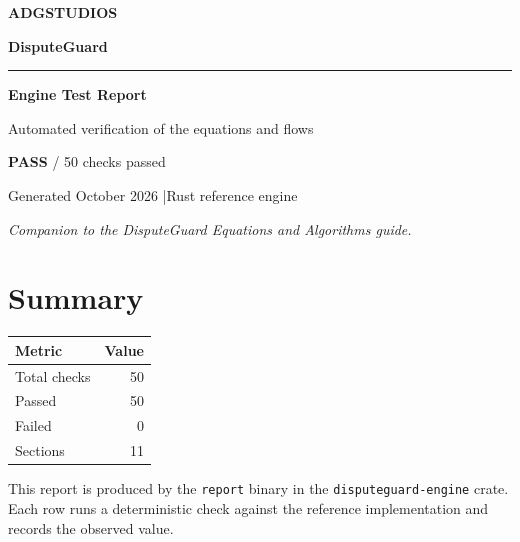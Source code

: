 \documentclass[11pt,a4paper]{article}
\newcommand{\pass}{\textcolor{PassGreen}{\textbf{PASS}}}
\begin{document}
\begin{titlepage}
  \centering
  \vspace*{2cm}
  {\Huge\bfseries ADGSTUDIOS\par}
  \vspace{0.4cm}
  {\LARGE\color{ADGBlue}\bfseries DisputeGuard\par}
  \vspace{1.3cm}
  \rule{0.85\textwidth}{0.8pt}
  \vspace{0.8cm}
  {\Large\bfseries Engine Test Report\par}
  \vspace{0.4cm}
  {\large Automated verification of the equations and flows\par}
  \vfill
  {\Large \pass{} / 50 checks passed\par}
  \vspace{0.6cm}
  {\large Generated October 2026 \quad|\quad Rust reference engine\par}
  \vfill
  \textit{Companion to the DisputeGuard Equations and Algorithms guide.}
\end{titlepage}

\section*{Summary}
\begin{center}
\begin{tabular}{@{}lr@{}}
\toprule
Metric & Value \\
\midrule
Total checks & 50 \\
Passed & \textcolor{PassGreen}{50} \\
Failed & \textcolor{FailRed}{0} \\
Sections & 11 \\
\bottomrule
\end{tabular}
\end{center}

\noindent This report is produced by the \texttt{report} binary in the \texttt{disputeguard-engine} crate. Each row runs a deterministic check against the reference implementation and records the observed value.\par
\vspace{0.5em}
\end{document}
